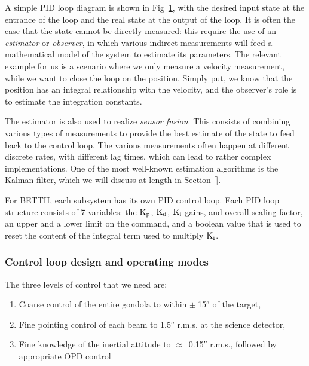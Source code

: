 \begin{figure}[!ht]
	\centering
	
	\caption{}
	\label{fig:SimplePID}
    \end{figure}



A simple PID loop diagram is shown in Fig~\ref{fig:SimplePID}, with the desired input state at the entrance of the loop and the real state at the output of the loop. It is often the case that the state cannot be directly measured: this require the use of an \textit{estimator} or \textit{observer}, in which various indirect measurements will feed a mathematical model of the system to estimate its parameters. The relevant example for us is a scenario where we only measure a velocity measurement, while we want to close the loop on the position. Simply put, we know that the position has an integral relationship with the velocity, and the observer's role is to estimate the integration constants.

The estimator is also used to realize \textit{sensor fusion}. This consists of combining various types of measurements to provide the best estimate of the state to feed back to the control loop. The various measurements often happen at different discrete rates, with different lag times, which can lead to rather complex implementations. One of the most well-known estimation algorithms is the Kalman filter, which we will discuss at length in Section []. 

For BETTII, each subsystem has its own PID control loop. Each PID loop structure consists of 7 variables: the $\textrm{K}_\textrm{p}$, $\textrm{K}_\textrm{d}$, $\textrm{K}_\textrm{i}$ gains, and overall scaling factor, an upper and a lower limit on the command, and a boolean value that is used to reset the content of the integral term used to multiply $\textrm{K}_\textrm{i}$. 

\subsubsection{Control loop design and operating modes}

The three levels of control that we need are:
\begin{enumerate}
\item Coarse control of the entire gondola to within $\pm~$\ang{;;15} of the target,
\item Fine pointing control of each beam to \ang{;;1.5} r.m.s. at the science detector,
\item Fine knowledge of the inertial attitude to $\approx$~\ang{;;0.15} r.m.s., followed by appropriate OPD control
\end{enumerate}

